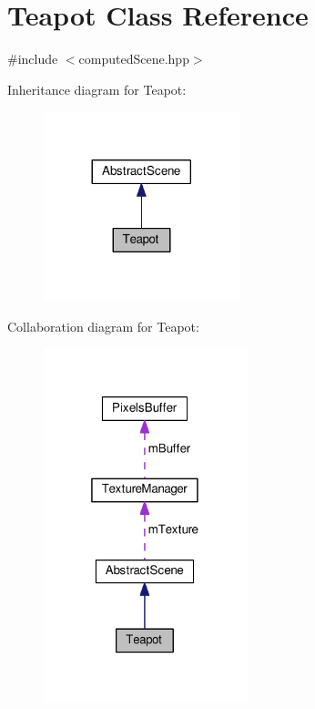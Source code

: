 \hypertarget{class_teapot}{\section{Teapot Class Reference}
\label{class_teapot}
}


{\ttfamily \#include $<$computed\+Scene.\+hpp$>$}



Inheritance diagram for Teapot\+:
\nopagebreak
\begin{figure}[H]
\begin{center}
\leavevmode
\includegraphics[width=161pt]{class_teapot__inherit__graph}
\end{center}
\end{figure}


Collaboration diagram for Teapot\+:
\nopagebreak
\begin{figure}[H]
\begin{center}
\leavevmode
\includegraphics[width=169pt]{class_teapot__coll__graph}
\end{center}
\end{figure}

